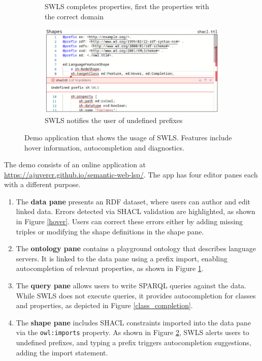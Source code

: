 \begin{figure}[tb]
\begin{subfigure}{0.48\textwidth}
      \caption{SWLS completes properties, first the properties with the correct domain}
      \label{property_completion}
    \end{subfigure}
    \hfill
    \begin{subfigure}{0.48\textwidth}
      \includegraphics[width=\textwidth]{./images/undefined.png}
      \caption{SWLS notifies the user of undefined prefixes}
      \label{undefined_prefix}
    \end{subfigure}
    \caption{
      Demo application that shows the usage of SWLS. Features include hover information, autocompletion and diagnostics.
    }\label{lst:Demo}
\end{figure}

The demo consists of an online application at \url{https://ajuvercr.github.io/semantic-web-lsp/}.
The app has four editor panes each with a different purpose.
%

\begin{enumerate}
  \item The \textbf{data pane} presents an RDF dataset, where users can author and edit linked data.
    Errors detected via SHACL validation are highlighted, as shown in Figure \ref{hover}.
    Users can correct these errors either by adding missing triples or modifying the shape definitions in the shape pane.
  \item The \textbf{ontology pane} contains a playground ontology that describes language servers.
    It is linked to the data pane using a prefix import, enabling autocompletion of relevant properties, as shown in Figure \ref{property_completion}.
  \item The \textbf{query pane} allows users to write SPARQL queries against the data. 
    While SWLS does not execute queries, it provides autocompletion for classes and properties, as depicted in Figure \ref{class_completion}.
  \item The \textbf{shape pane} includes SHACL constraints imported into the data pane via the \texttt{owl:imports} property. 
    As shown in Figure \ref{undefined_prefix}, SWLS alerts users to undefined prefixes, and typing a prefix triggers autocompletion suggestions, adding the import statement.
\end{enumerate}

